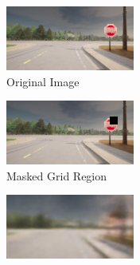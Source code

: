 \begin{figure}[htbp]
\centering
\begin{subfigure}[b]{0.3\textwidth}
    \includegraphics[width=\textwidth]{img/masking/grid_based_masking/original.png}
    \caption{Original Image}
    \label{fig:grid_orig}
\end{subfigure}
\hfill
\begin{subfigure}[b]{0.3\textwidth}
    \includegraphics[width=\textwidth]{img/masking/grid_based_masking/reconstructed_grid_masked_image.png}
    \caption{Masked Grid Region}
    \label{fig:grid_masked}
\end{subfigure}
\hfill
\begin{subfigure}[b]{0.3\textwidth}
    \includegraphics[width=\textwidth]{img/masking/grid_based_masking/CE_grid.png}

\end{subfigure}
\end{figure}
